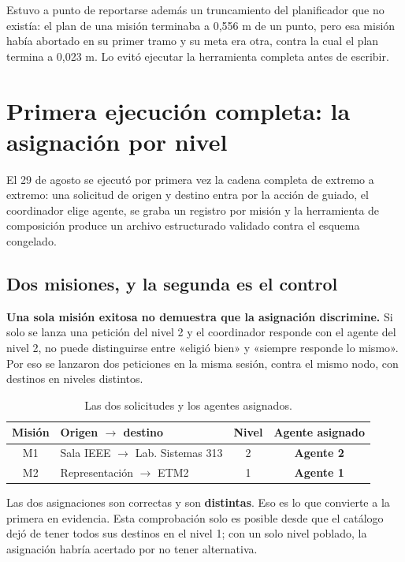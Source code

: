 \documentclass[12pt,letterpaper]{article}
\begin{document}
Estuvo a punto de reportarse además un truncamiento del planificador que no existía: el plan de una misión terminaba a 0,556 m de un punto, pero esa misión había abortado en su primer tramo y su meta era otra, contra la cual el plan termina a 0,023 m. Lo evitó ejecutar la herramienta completa antes de escribir.

\section{Primera ejecución completa: la asignación por nivel}
\label{sec:asignacion}

El 29 de agosto se ejecutó por primera vez la cadena completa de extremo a extremo: una solicitud de origen y destino entra por la acción de guiado, el coordinador elige agente, se graba un registro por misión y la herramienta de composición produce un archivo estructurado validado contra el esquema congelado.

\subsection{Dos misiones, y la segunda es el control}

\textbf{Una sola misión exitosa no demuestra que la asignación discrimine.} Si solo se lanza una petición del nivel 2 y el coordinador responde con el agente del nivel 2, no puede distinguirse entre «eligió bien» y «siempre responde lo mismo». Por eso se lanzaron dos peticiones en la misma sesión, contra el mismo nodo, con destinos en niveles distintos.

\begin{table}[H]
    \centering
    \small
    \caption{Las dos solicitudes y los agentes asignados.}
    \label{tab:asignacion}
    \begin{tabular}{@{}clcc@{}}
        \toprule
        \textbf{Misión} & \textbf{Origen $\rightarrow$ destino} & \textbf{Nivel} & \textbf{Agente asignado} \\ \midrule
        M1 & Sala IEEE $\rightarrow$ Lab. Sistemas 313 & 2 & \textbf{Agente 2} \\
        M2 & Representación $\rightarrow$ ETM2 & 1 & \textbf{Agente 1} \\ \bottomrule
    \end{tabular}
\end{table}

Las dos asignaciones son correctas y son \textbf{distintas}. Eso es lo que convierte a la primera en evidencia. Esta comprobación solo es posible desde que el catálogo dejó de tener todos sus destinos en el nivel 1; con un solo nivel poblado, la asignación habría acertado por no tener alternativa.
\end{document}
